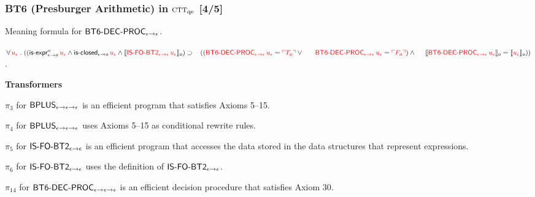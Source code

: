 \documentclass[t,12pt,numbers,fleqn]{beamer}
\newcommand{\churchqe}{$\mbox{\sc ctt}_{\rm qe}$}
\newcommand{\syn}[1]{\textcolor{red}{#1}}
\begin{document}
\begin{frame}
\frametitle{BT6 (Presburger Arithmetic) in {\churchqe} [4/5]}
\small
\vspace{-2ex}
\bi

  \item[]

  \be

    \setcounter{enumi}{28}

    \item Meaning formula for $\mbox{\sf BT6-DEC-PROC}_{\epsilon \rightarrow \epsilon}$.

    $\ForallApp \syn{u_\epsilon} \mdot 
    ((\mname{is-expr}_{\epsilon \tarrow o}^{o} \, 
    \syn{u_\epsilon}  \Andd
    \mname{is-closed}_{\epsilon \tarrow o} \, \syn{u_\epsilon} \Andd 
    \sembrack{\syn{\mname{IS-FO-BT2}_{\epsilon \tarrow \epsilon} \, 
    u_\epsilon}}_o) \Implies {}\newline
    \hspace*{2ex}((\syn{\mname{BT6-DEC-PROC}_{\epsilon \tarrow \epsilon} \, u_\epsilon} = 
    \syn{\synbrack{T_o}} \Orr {}\newline
    \hspace*{3.9ex}\syn{\mname{BT6-DEC-PROC}_{\epsilon \tarrow \epsilon} \, u_\epsilon} = 
    \syn{\synbrack{F_o}}) \Andd {}\newline
    \hspace*{3.1ex}
    \sembrack{\syn{\mname{BT6-DEC-PROC}_{\epsilon \tarrow \epsilon} \, u_\epsilon}}_o =
    \sembrack{\syn{u_\epsilon}}_o))$.

  \ee

  \item[] \textbf{Transformers}

  \be

    \setcounter{enumi}{2}

    \item $\pi_3$ for $\mbox{\sf BPLUS}_{\epsilon \rightarrow \epsilon
      \rightarrow \epsilon}$ is an efficient program that satisfies Axioms
      5--15.

    \item $\pi_4$ for $\mbox{\sf BPLUS}_{\epsilon \rightarrow \epsilon
      \rightarrow \epsilon}$ uses Axioms 5--15 as conditional rewrite
      rules.

    \item $\pi_5$ for $\mbox{\sf IS-FO-BT2}_{\epsilon \rightarrow
      \epsilon}$ is an efficient program that accesses the data
      stored in the data structures that represent expressions.

    \item $\pi_6$ for $\mbox{\sf IS-FO-BT2}_{\epsilon \rightarrow \epsilon}$
      uses the definition of $\mbox{\sf IS-FO-BT2}_{\epsilon \rightarrow
        \epsilon}$.

    \setcounter{enumi}{13}

    \item $\pi_{14}$ for $\mbox{\sf BT6-DEC-PROC}_{\epsilon \rightarrow
      \epsilon \rightarrow \epsilon}$ is an efficient decision procedure
      that satisfies Axiom 30.

  \ee

\ei
\end{frame}
\end{document}
